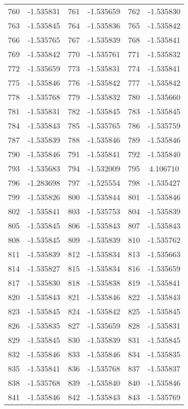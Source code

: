 \documentclass[12pt]{article}
\begin{document}
\begin{longtable}{@{}cc|cc|cc@{}}
760 & -1.535831 & 761 & -1.535659 & 762 & -1.535830 \\
763 & -1.535845 & 764 & -1.535836 & 765 & -1.535842 \\
766 & -1.535765 & 767 & -1.535839 & 768 & -1.535841 \\
769 & -1.535842 & 770 & -1.535761 & 771 & -1.535832 \\
772 & -1.535659 & 773 & -1.535831 & 774 & -1.535841 \\
775 & -1.535846 & 776 & -1.535842 & 777 & -1.535842 \\
778 & -1.535768 & 779 & -1.535832 & 780 & -1.535660 \\
781 & -1.535831 & 782 & -1.535845 & 783 & -1.535845 \\
784 & -1.535843 & 785 & -1.535765 & 786 & -1.535759 \\
787 & -1.535839 & 788 & -1.535846 & 789 & -1.535846 \\
790 & -1.535846 & 791 & -1.535841 & 792 & -1.535840 \\
793 & -1.535683 & 794 & -1.532009 & 795 & 4.106710 \\
796 & -1.283698 & 797 & -1.525554 & 798 & -1.535427 \\
799 & -1.535826 & 800 & -1.535844 & 801 & -1.535846 \\
802 & -1.535841 & 803 & -1.535753 & 804 & -1.535839 \\
805 & -1.535845 & 806 & -1.535843 & 807 & -1.535843 \\
808 & -1.535845 & 809 & -1.535839 & 810 & -1.535762 \\
811 & -1.535839 & 812 & -1.535834 & 813 & -1.535663 \\
814 & -1.535827 & 815 & -1.535834 & 816 & -1.535659 \\
817 & -1.535830 & 818 & -1.535838 & 819 & -1.535841 \\
820 & -1.535843 & 821 & -1.535846 & 822 & -1.535843 \\
823 & -1.535845 & 824 & -1.535842 & 825 & -1.535845 \\
826 & -1.535835 & 827 & -1.535659 & 828 & -1.535831 \\
829 & -1.535845 & 830 & -1.535839 & 831 & -1.535845 \\
832 & -1.535846 & 833 & -1.535846 & 834 & -1.535835 \\
835 & -1.535841 & 836 & -1.535768 & 837 & -1.535837 \\
838 & -1.535768 & 839 & -1.535840 & 840 & -1.535846 \\
841 & -1.535846 & 842 & -1.535843 & 843 & -1.535769 \\

\end{longtable}
\end{document}
